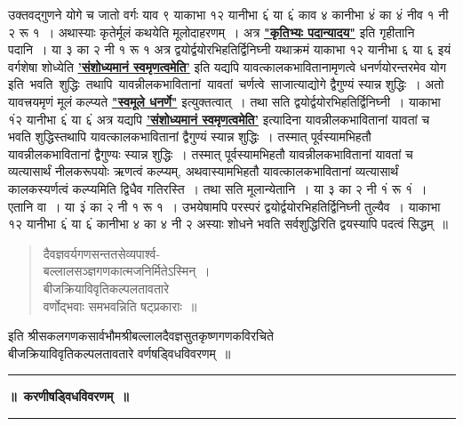 \documentclass[11pt, openany]{book}
\begin{document}
\noindent उक्तवद्गुणने योगे च जातो वर्गः याव ९ याकाभा १२ यानीभा ६ं या ६ं काव ४ कानीभा ४ं का ४ं नीव १ नी २ रू १~। अथास्याः कृतेर्मूलं कथयेति मूलोदाहरणम्~। अत्र \hyperref[1.11]{\textbf{"कृतिभ्यः पदान्यादय"}} इति गृहीतानि पदानि~। या ३ का २ नी १ रू १ अत्र द्वयोर्द्वयोरभिहतिर्द्विनिघ्नी यथाक्रमं याकाभा १२ यानीभा ६ या ६ इयं वर्गशेषा शोध्येति \hyperref[1.3]{\textbf{'संशोध्यमानं स्वमृणत्वमेति'}} इति यद्यपि यावत्कालकभावितानामृणत्वे धनर्णयोरन्तरमेव योग \,इति \,भवति \,शुद्धिः \,तथापि \,यावन्नीलकभावितानां \,यावतां \,चर्णत्वे \,साजात्याद्योगे द्वैगुण्यं स्यान्न शुद्धिः~। अतो यावत्त्रयमृणं मूलं कल्प्यते \hyperref[1.4]{\textbf{"स्वमूले धनर्णे"}} इत्युक्तत्वात्~। तथा सति द्वयोर्द्वयोरभिहतिर्द्विनिघ्नी~। याकाभा १ं२ यानीभा ६ं या ६ं अत्र यद्यपि \hyperref[1.3]{\textbf{'संशोध्यमानं स्वमृणत्वमेति'}} इत्यादिना यावन्नीलकभावितानां यावतां च भवति शुद्धिस्तथापि यावत्कालकभावितानां द्वैगुण्यं स्यान्न शुद्धिः~। तस्मात् पूर्वस्यामभिहतौ यावन्नीलकभावितानां द्वैगुण्यः स्यान्न शुद्धिः~। तस्मात् पूर्वस्यामभिहतौ यावन्नीलकभावितानां यावतां च व्यत्यासार्थं नीलकरूपयोः ऋणत्वं कल्प्यम्, अथवास्यामभिहतौ यावत्कालकभावितानां व्यत्यासार्थं कालकस्यर्णत्वं कल्प्यमिति द्विधैव गतिरस्ति~। तथा सति मूलान्येतानि~। या ३ का २ नी १ं रू १ं~। एतानि वा~। या ३ं का $\dot{\text{२}}$ नी १ रू १~। उभयेषामपि परस्परं द्वयोर्द्वयोरभिहतिर्द्विनिघ्नी तुल्यैव~। याकाभा १२ यानीभा ६ं या ६ं कानीभा ४ का ४ नी २ अस्याः शोधने भवति सर्वशुद्धिरिति द्वयस्यापि पदत्वं सिद्धम्~॥ 
\begin{quote}
    \qt
     दैवज्ञवर्यगणसन्ततसेव्यपार्श्व- \\
बल्लालसञ्ज्ञगणकात्मजनिर्मितेऽस्मिन्~। \\
बीजक्रियाविवृतिकल्पलतावतारे \\
वर्णोद्भवाः समभवन्निति षट्प्रकाराः~॥
\end{quote}

\begin{center}
   इति श्रीसकलगणकसार्वभौमश्रीबल्लालदैवज्ञसुतकृष्णगणकविरचिते \\
 बीजक्रियाविवृतिकल्पलतावतारे वर्णषड्विधविवरणम्~॥\\

  \rule{0.2\linewidth}{0.7pt}
\end{center}

\newpage
\thispagestyle{empty}
\begin{center}
 \label{karanii}
    \textbf{\LARGE ॥~करणीषड्विधविवरणम्~॥}\\
    
    \vspace{1mm}
    \rule{0.2\textwidth}{0.7pt}
\end{center}
\end{document}
